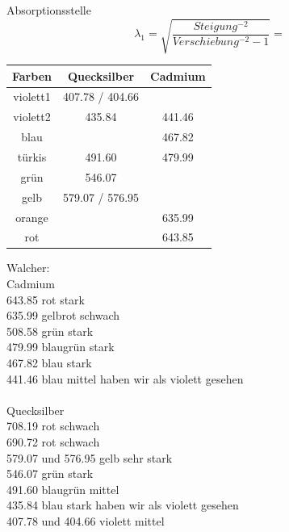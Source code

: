 Absorptionsstelle \[ \lambda_1 = \sqrt{\frac{Steigung^{-2}}{Verschiebung^{-2}-1}} =  \]


\clearpage


\begin{table}
\centering
\begin{tabular}{c|c|c}
	Farben & Quecksilber & Cadmium \\
	\hline
	violett1 & 407.78 / 404.66 & \\
	violett2 & 435.84 & 441.46 \\
	blau &  & 467.82 \\
	türkis & 491.60 & 479.99 \\
	grün & 546.07 & \\
	gelb & 579.07 / 576.95 & \\
	orange &  & 635.99 \\
	rot &  & 643.85 \\
\end{tabular}
\end{table}
Walcher: \\
Cadmium \\
643.85	rot			stark \\
635.99	gelbrot		schwach \\
508.58	grün		stark \\
479.99	blaugrün	stark \\
467.82	blau		stark \\
441.46	blau		mittel \qquad haben wir als violett gesehen \\
\ \\
Quecksilber \\
708.19	rot			schwach \\
690.72	rot			schwach \\
579.07 und 576.95	gelb		sehr stark \\
546.07	grün		stark \\
491.60	blaugrün	mittel \\
435.84	blau		stark \qquad haben wir als violett gesehen \\
407.78 und 404.66	violett		mittel \\